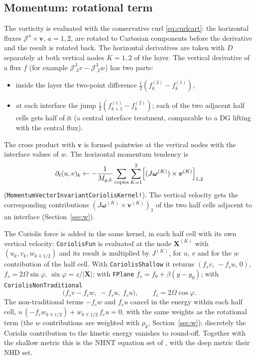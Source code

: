 \documentclass[11pt,a4paper]{article}
\newcommand{\vv}{\bm{v}}
\newcommand{\Jm}{\mathcal{J}}
\newcommand{\code}[1]{\texttt{#1}}
\begin{document}
\subsection{Momentum: rotational term}
\label{sec:rot}

The vorticity is evaluated with the conservative curl \eqref{eq:curlcart}:
the horizontal fluxes $\Jm^a\times\vv$, $a=1,2$, are rotated to Cartesian
components before the derivative and the result is rotated back.
The horizontal derivatives are taken with $D$ separately at both vertical
nodes $K=1,2$ of the layer. The vertical derivative of a flux $f$ (for example
$\Jm^3_{\;3}v - \Jm^3_{\;2}w$) has two parts:
\begin{itemize}
\item inside the layer the two-point difference $\tfrac12(f^{(2)}_k - f^{(1)}_k)$,
\item at each interface the jump $\tfrac12(f^{(1)}_{k+1} - f^{(2)}_k)$; each of
  the two adjacent half cells gets half of it (a central interface
  treatment, comparable to a DG lifting with the central flux).
\end{itemize}
The cross product with $\vv$ is formed pointwise at the vertical nodes with the
interface values of $w$. The horizontal momentum tendency is
\begin{equation}
  \partial_t (u,v)_k \leftarrow
  -\frac{1}{M_{g,k}}\sum_{\text{copies}}\sum_{K=1}^2
  \Bigl[(J\bm\omega^{(K)})\times\vv^{(K)}\Bigr]_{1,2}
\end{equation}
(\code{MomentumVectorInvariantCoriolisKernel!}). The vertical velocity gets
the corresponding contributions $(J\bm\omega^{(K)}\times\vv^{(K)})_3$ of the
two half cells adjacent to an interface (Section~\ref{sec:w}).

The Coriolis force is added in the same kernel, in each half cell with its
own vertical velocity: \code{CoriolisFun} is evaluated at the node
$\bm X^{(K)}$ with $(u_k,v_k,w_{k\mp1/2})$ and its result is multiplied by
$J^{(K)}$, for $u$, $v$ and for the $w$ contribution of the half cell.
With
\code{CoriolisShallow} it returns $(f_sv,\,-f_su,\,0)$,
$f_s = 2\Omega\sin\varphi$, $\sin\varphi = z/|\bm X|$; with \code{FPlane}
$f_s = f_0 + \beta(y-y_0)$; with \code{CoriolisNonTraditional}
\begin{equation}
  \bigl(f_sv - f_cw,\; -f_su,\; f_cu\bigr),\qquad
  f_c = 2\Omega\cos\varphi .
\end{equation}
The non-traditional terms $-f_cw$ and $f_cu$ cancel in the energy within each
half cell, $u\,(-f_cw_{k\mp1/2}) + w_{k\mp1/2}\,f_cu = 0$, with the same
weights as the rotational term (the $w$ contributions are weighted with
$\rho_k$, Section~\ref{sec:w}); discretely the Coriolis contribution to the
kinetic energy vanishes to round-off. Together with the shallow metric this is
the NHNT equation set of \cite{Hughes2026}, with the deep metric their NHD
set.
\end{document}
